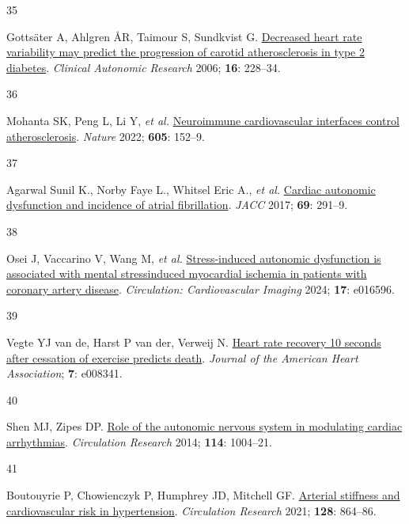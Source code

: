 \documentclass[
  a4paper,
  headsepline=true,
  open=any]{scrbook}
\newlength{\cslhangindent}
\newlength{\csllabelwidth}
\newlength{\cslentryspacingunit} %
\newenvironment{CSLReferences}[2] %
 {%
  \setlength{\parindent}{0pt}
  \ifodd #1
  \let\oldpar\par
  \def\par{\hangindent=\cslhangindent\oldpar}
  \fi
  \setlength{\parskip}{#2\cslentryspacingunit}
 }%
 {}
\newcommand{\CSLLeftMargin}[1]{\parbox[t]{\csllabelwidth}{#1}}
\newcommand{\CSLRightInline}[1]{\parbox[t]{\linewidth - \csllabelwidth}{#1}\break}
\begin{document}
\begin{CSLReferences}{0}{0}
\leavevmode{}%
\CSLLeftMargin{35 }%
\CSLRightInline{Gottsäter A, Ahlgren ÅR, Taimour S, Sundkvist G.
\href{https://doi.org/10.1007/s10286-006-0345-4}{Decreased heart rate
variability may predict the progression of carotid atherosclerosis in
type 2 diabetes}. \emph{Clinical Autonomic Research} 2006; \textbf{16}:
228--34.}

\leavevmode{}%
\CSLLeftMargin{36 }%
\CSLRightInline{Mohanta SK, Peng L, Li Y, \emph{et al.}
\href{https://doi.org/10.1038/s41586-022-04673-6}{Neuroimmune
cardiovascular interfaces control atherosclerosis}. \emph{Nature} 2022;
\textbf{605}: 152--9.}

\leavevmode{}%
\CSLLeftMargin{37 }%
\CSLRightInline{Agarwal Sunil K., Norby Faye L., Whitsel Eric A.,
\emph{et al.} \href{https://doi.org/10.1016/j.jacc.2016.10.059}{Cardiac
autonomic dysfunction and incidence of atrial fibrillation}. \emph{JACC}
2017; \textbf{69}: 291--9.}

\leavevmode{}%
\CSLLeftMargin{38 }%
\CSLRightInline{Osei J, Vaccarino V, Wang M, \emph{et al.}
\href{https://doi.org/10.1161/CIRCIMAGING.124.016596}{Stress-induced
autonomic dysfunction is associated with mental
stress{\textendash}induced myocardial ischemia in patients with coronary
artery disease}. \emph{Circulation: Cardiovascular Imaging} 2024;
\textbf{17}: e016596.}

\leavevmode{}%
\CSLLeftMargin{39 }%
\CSLRightInline{Vegte YJ van de, Harst P van der, Verweij N.
\href{https://doi.org/10.1161/JAHA.117.008341}{Heart rate recovery 10
seconds after cessation of exercise predicts death}. \emph{Journal of
the American Heart Association}; \textbf{7}: e008341.}

\leavevmode{}%
\CSLLeftMargin{40 }%
\CSLRightInline{Shen MJ, Zipes DP.
\href{https://doi.org/10.1161/CIRCRESAHA.113.302549}{Role of the
autonomic nervous system in modulating cardiac arrhythmias}.
\emph{Circulation Research} 2014; \textbf{114}: 1004--21.}

\leavevmode{}%
\CSLLeftMargin{41 }%
\CSLRightInline{Boutouyrie P, Chowienczyk P, Humphrey JD, Mitchell GF.
\href{https://doi.org/10.1161/CIRCRESAHA.121.318061}{Arterial stiffness
and cardiovascular risk in hypertension}. \emph{Circulation Research}
2021; \textbf{128}: 864--86.}


\end{CSLReferences}
\end{document}
